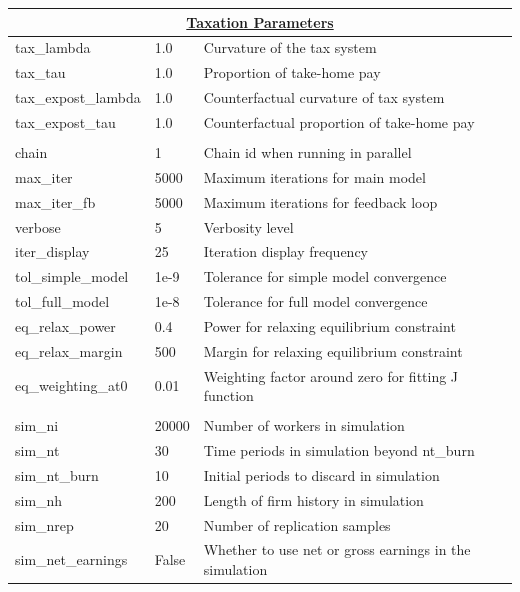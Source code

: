 \documentclass{article}
\begin{document}
\begin{longtable}{llp{10cm}}
    \multicolumn{3}{c}{\underline{Taxation Parameters}} \\
    \midrule
    tax\_lambda & 1.0 & Curvature of the tax system \\
    tax\_tau & 1.0 & Proportion of take-home pay \\
    tax\_expost\_lambda & 1.0 & Counterfactual curvature of tax system \\
    tax\_expost\_tau & 1.0 & Counterfactual proportion of take-home pay \\
    \addlinespace
    
    \multicolumn{3}{c}{\underline{Computational Parameters}} \\
    \midrule
    chain & 1 & Chain id when running in parallel \\
    max\_iter & 5000 & Maximum iterations for main model \\
    max\_iter\_fb & 5000 & Maximum iterations for feedback loop \\
    verbose & 5 & Verbosity level \\
    iter\_display & 25 & Iteration display frequency \\
    tol\_simple\_model & 1e-9 & Tolerance for simple model convergence \\
    tol\_full\_model & 1e-8 & Tolerance for full model convergence \\
    eq\_relax\_power & 0.4 & Power for relaxing equilibrium constraint \\
    eq\_relax\_margin & 500 & Margin for relaxing equilibrium constraint \\
    eq\_weighting\_at0 & 0.01 & Weighting factor around zero for fitting J function \\
    \addlinespace
    
    \multicolumn{3}{c}{\underline{Simulation Parameters}} \\
    \midrule
    sim\_ni & 20000 & Number of workers in simulation \\
    sim\_nt & 30 & Time periods in simulation beyond nt\_burn \\
    sim\_nt\_burn & 10 & Initial periods to discard in simulation \\
    sim\_nh & 200 & Length of firm history in simulation \\
    sim\_nrep & 20 & Number of replication samples \\
    sim\_net\_earnings & False & Whether to use net or gross earnings in the simulation \\
    \bottomrule
\end{longtable}
    
\end{document}
